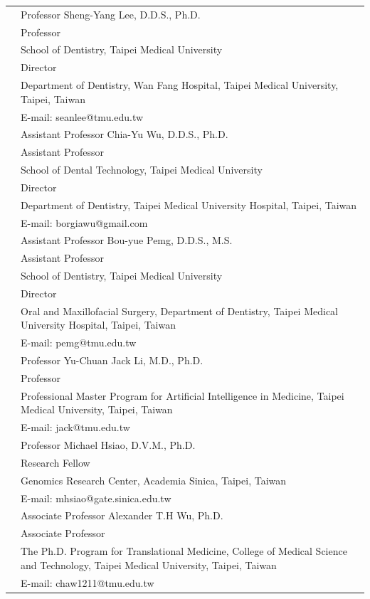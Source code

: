 \documentclass[letterpaper, 11pt]{article}
\begin{document}
\begin{longtable}{p{1.3in}p{4.8in}}

\nohyphens{\color{OliveGreen}{References}} 
& Professor Sheng-Yang Lee, D.D.S., Ph.D.\\
& Professor\\
& School of Dentistry, Taipei Medical University\\
& Director\\
& Department of Dentistry,
Wan Fang Hospital, Taipei Medical University,
Taipei, Taiwan\\
& E-mail: seanlee@tmu.edu.tw\\[0.5cm]

& Assistant Professor Chia-Yu Wu, D.D.S., Ph.D.\\
& Assistant Professor\\
& School of Dental Technology, Taipei Medical University\\
& Director\\
& Department of Dentistry,
Taipei Medical University Hospital,
Taipei, Taiwan\\
& E-mail: borgiawu@gmail.com\\[0.5cm]

& Assistant Professor Bou-yue Pemg, D.D.S., M.S.\\
& Assistant Professor\\
& School of Dentistry, Taipei Medical University\\
& Director\\
& Oral and Maxillofacial Surgery, Department of Dentistry,
Taipei Medical University Hospital,
Taipei, Taiwan\\
& E-mail: pemg@tmu.edu.tw\\[0.5cm]

& Professor Yu-Chuan Jack Li, M.D.,  Ph.D.\\
& Professor\\
& Professional Master Program for Artificial Intelligence in Medicine, Taipei Medical University,
Taipei, Taiwan\\
& E-mail: jack@tmu.edu.tw\\[0.5cm]


& Professor Michael Hsiao, D.V.M., Ph.D.\\
& Research Fellow\\
& Genomics Research Center, 
Academia Sinica, Taipei, Taiwan\\
& E-mail: mhsiao@gate.sinica.edu.tw\\[0.5cm]

& Associate Professor Alexander T.H Wu, Ph.D.\\
& Associate Professor\\
& The Ph.D. Program for Translational Medicine,
College of Medical Science and Technology,
Taipei Medical University,
Taipei, Taiwan\\
& E-mail: chaw1211@tmu.edu.tw\\




\end{longtable}
\end{document}
